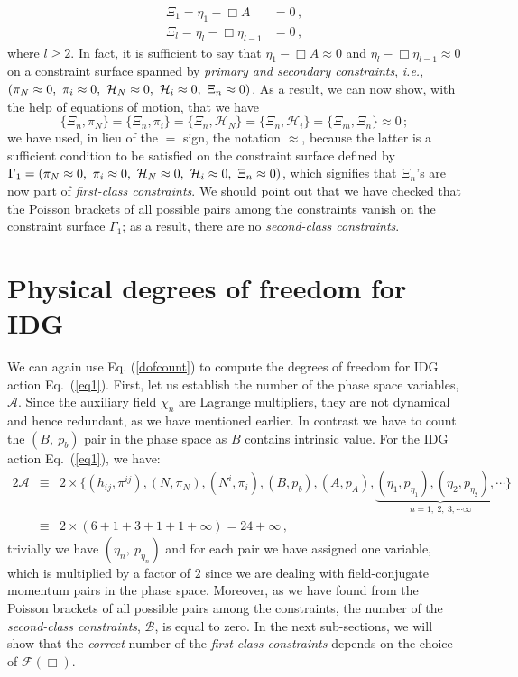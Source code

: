 \documentclass[a4paper,12pt]{article}
\newcommand{\Ga}{\Gamma}
\newcommand{\+}{^{\dagger}}
\newcommand{\2}{\frac{1}{2}}
\newcommand{\3}{\frac{1}{3}}
\newcommand{\4}{\frac{1}{4}}
\newcommand{\6}{\frac{1}{6}}
\newcommand{\8}{\frac{1}{8}}
\newcommand{\non}{\nonumber\\}
\begin{document}
\begin{align}
\Xi_{1} = \eta_{1}-\Box A & = 0 \,, \non
\Xi_{l} = \eta_{l}-\Box \eta_{l-1}& = 0 \,,
\end{align} 
where $l \geq 2$. In fact, it is sufficient to say that $ \eta_{1}-\Box A \approx 0$ and $\eta_{l}-\Box \eta_{l-1} \approx 0$ on a constraint surface spanned by {\it primary and secondary constraints}, \textit{i.e.}, $(\pi_N\approx 0,~\pi_{i}\approx 0,~{\cal H}_{N}\approx 0,~{\cal H}_{i}\approx 0,~\Xi_{n}\approx 0)$.
As a result, we can now show, with the help of equations of motion, that we have
\begin{equation}
\{\Xi _{n},\pi_N\}=\{\Xi _{n},\pi_i\}=\{\Xi _{n},\mathcal{H}_{N}\}=\{\Xi _{n},\mathcal{H}_{i}\}=\{\Xi _{m},\Xi _{n}\}\approx 0\,;
\end{equation}
we have used, in lieu of the $=$ sign, the notation $\approx$, because the latter is a sufficient condition to be satisfied on the 
constraint surface defined by $\Ga_1=(\pi_N\approx 0,~\pi_{i}\approx 0,~{\cal H}_{N}\approx 0,~{\cal H}_{i}\approx 0,~\Xi_{n}\approx 0)$, which signifies that $\Xi _{n}$'s are now part of  {\it first-class constraints}. We should point out that we have checked that the Poisson brackets of all possible pairs among the constraints vanish on the constraint surface $\Ga_1$; as a result, there are no \textit{second-class constraints}. 





\section{Physical degrees of freedom for IDG }


We can again use Eq. (\ref{dofcount}) to compute the degrees of freedom for IDG action Eq.~(\ref{eq1}). First, let us establish the
number of the phase space variables, $\mathcal{A}$. Since the auxiliary field $\chi_n$ are Lagrange multipliers, they are 
not dynamical and hence redundant, as we have mentioned earlier. In contrast we have to count the $(B,~p_b)$ pair in 
the phase space as $B$ contains intrinsic value. For the IDG action Eq.~(\ref{eq1}), we have:
\begin{eqnarray}\label{phasespacevariables}
2\mathcal{A}&\equiv&2\times\bigg\{(h_{ij}, \pi^{ij}),(N,\pi_N),(N^i,
\pi_i),(B,p_b),(A,p_A),\underbrace{(\eta_1,p_{\eta_1}),(\eta_2,p_{\eta_2}),\cdots}_{n=1,~2,~3,\cdots \infty}\bigg\}\nonumber\\
&\equiv&2\times(6+1+3+1+1+\infty)=24+\infty\,,
\end{eqnarray}   
trivially we have $(\eta_n,~p_{\eta_n})$ and for each pair we have assigned one variable, which is multiplied by a factor of $2$ since we are dealing with field-conjugate momentum pairs in the phase space. Moreover, as we have found from the Poisson brackets of all possible pairs among the constraints, the number of the {\it second-class constraints}, $\mathcal{B}$, is equal to zero. In the next sub-sections, we will show that the \textit{correct} number of the {\it first-class constraints} depends on the choice of $\mathcal{F}(\Box)$.
\end{document}
